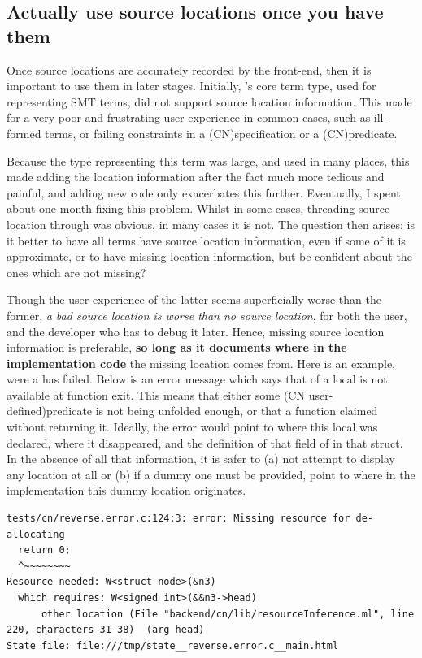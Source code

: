 \subsection{Actually use source locations once you have them}

Once source locations are accurately recorded by the front-end, then it is
important to use them in later stages. Initially, 's core term type,
used for representing SMT terms, did not support source location information.
This made for a very poor and frustrating user experience in common cases, such
as ill-formed terms, or failing constraints in a \kl(CN){specification} or a
\kl(CN){predicate}.

Because the type representing this term was large, and used in many places,
this made adding the location information after the fact much more tedious and
painful, and adding new code only exacerbates this further. Eventually, I spent
about one month fixing this
problem.
Whilst in some cases, threading source location through was obvious,
in many cases it is not. The question then arises: is it better to have all
terms have source location information, even if some of it is approximate,
or to have missing location information, but be confident about the ones
which are not missing?

Though the user-experience of the latter seems superficially worse than the
former, \emph{a bad source location is worse than no source location}, for both
the user, and the developer who has to debug it later. Hence, missing source
location information is preferable, \textbf{so long as it documents where in
the implementation code} the missing location comes from. Here is an example,
were a  has failed. Below is an error message which says that
 of a local is not available at function exit. This means that either
some \kl(CN user-defined){predicate} is not being unfolded enough, or that a
function claimed  without returning it. Ideally, the error would
point to where this local was declared, where it disappeared, and the
definition of that field of in that struct. In the absence of all that
information, it is safer to (a) not attempt to display any location at all or
(b) if a dummy one must be provided, point to where in the implementation this
dummy location originates.

\begin{verbatim}
tests/cn/reverse.error.c:124:3: error: Missing resource for de-allocating
  return 0;
  ^~~~~~~~~
Resource needed: W<struct node>(&n3)
  which requires: W<signed int>(&&n3->head)
      other location (File "backend/cn/lib/resourceInference.ml", line 220, characters 31-38)  (arg head)
State file: file:///tmp/state__reverse.error.c__main.html
\end{verbatim}

